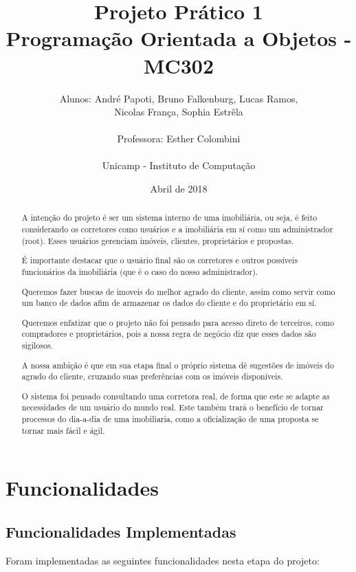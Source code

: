 \documentclass[a4paper,11pt,fleqn]{article}
\title{Projeto Prático 1\\
Programação Orientada a Objetos - MC302}
\author{Alunos: André Papoti, Bruno Falkenburg, Lucas Ramos, \\
Nicolas França, Sophia Estrêla\\\\
Professora: Esther Colombini\\\\
Unicamp - Instituto de Computação\\}
\date{Abril de 2018}
\begin{document}
\maketitle

\begin{abstract}
\noindent

A intenção do projeto é ser um sistema interno de uma imobiliária, ou seja, é feito considerando os corretores como usuários e a imobiliária em sí como um administrador (root). Esses usuários gerenciam imóveis, clientes, proprietários e propostas.

É importante destacar que o usuário final são os corretores e outros possíveis funcionários da imobiliária (que é o caso do nosso administrador).

Queremos fazer buscas de imoveis do melhor agrado do cliente, assim como servir como um banco de dados afim de armazenar os dados do cliente e do proprietário em sí.

Queremos enfatizar que o projeto não foi pensado para acesso direto de terceiros, como compradores e proprietários, pois a nossa regra de negócio diz que esses dados são sigilosos.

A nossa ambição é que em sua etapa final o próprio sistema dê sugestões de imóveis do agrado do cliente, cruzando suas preferências com os imóveis disponíveis.

O sistema foi pensado consultando uma corretora real, de forma que este se adapte as necessidades de um usuário do mundo real. Este também trará o benefício de tornar processos do dia-a-dia de uma imobiliaria, como a oficialização de uma proposta se tornar mais fácil e ágil.

\end{abstract}

\section{Funcionalidades}
\label{s:funcionalidades}

\subsection{Funcionalidades Implementadas}
\label{ss:func-impl}


Foram implementadas as seguintes funcionalidades nesta etapa do projeto:
\end{document}
